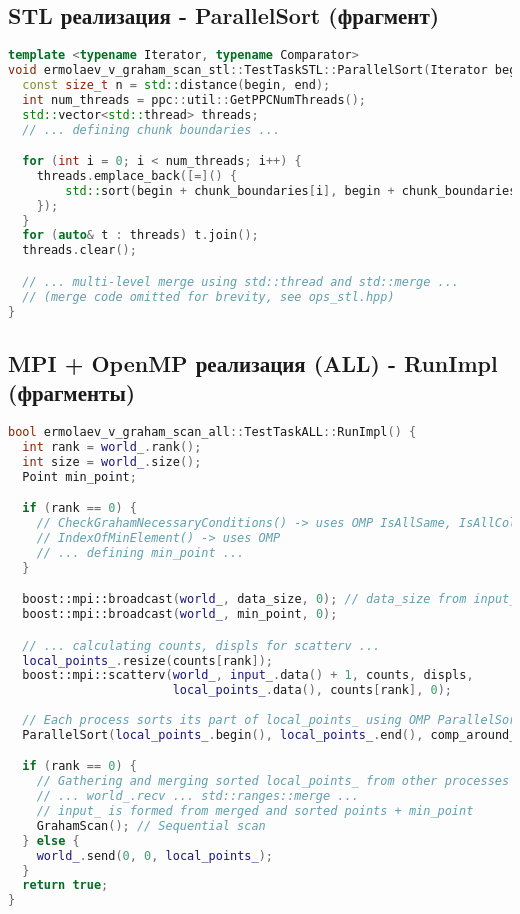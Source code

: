 \documentclass[12pt]{article}
\begin{document}
\subsection{STL реализация - ParallelSort (фрагмент)}
\begin{lstlisting}[language=C++]
template <typename Iterator, typename Comparator>
void ermolaev_v_graham_scan_stl::TestTaskSTL::ParallelSort(Iterator begin, Iterator end, Comparator comp) {
  const size_t n = std::distance(begin, end);
  int num_threads = ppc::util::GetPPCNumThreads();
  std::vector<std::thread> threads;
  // ... defining chunk boundaries ...

  for (int i = 0; i < num_threads; i++) {
    threads.emplace_back([=]() { 
        std::sort(begin + chunk_boundaries[i], begin + chunk_boundaries[i + 1], comp); 
    });
  }
  for (auto& t : threads) t.join();
  threads.clear();

  // ... multi-level merge using std::thread and std::merge ...
  // (merge code omitted for brevity, see ops_stl.hpp)
}
\end{lstlisting}
\newpage

\subsection{MPI + OpenMP реализация (ALL) - RunImpl (фрагменты)}
\begin{lstlisting}[language=C++]
bool ermolaev_v_graham_scan_all::TestTaskALL::RunImpl() {
  int rank = world_.rank();
  int size = world_.size();
  Point min_point;

  if (rank == 0) {
    // CheckGrahamNecessaryConditions() -> uses OMP IsAllSame, IsAllCollinear
    // IndexOfMinElement() -> uses OMP
    // ... defining min_point ...
  }

  boost::mpi::broadcast(world_, data_size, 0); // data_size from input_
  boost::mpi::broadcast(world_, min_point, 0);

  // ... calculating counts, displs for scatterv ...
  local_points_.resize(counts[rank]);
  boost::mpi::scatterv(world_, input_.data() + 1, counts, displs, 
                       local_points_.data(), counts[rank], 0);
  
  // Each process sorts its part of local_points_ using OMP ParallelSort
  ParallelSort(local_points_.begin(), local_points_.end(), comp_around_min_point);

  if (rank == 0) {
    // Gathering and merging sorted local_points_ from other processes
    // ... world_.recv ... std::ranges::merge ...
    // input_ is formed from merged and sorted points + min_point
    GrahamScan(); // Sequential scan
  } else {
    world_.send(0, 0, local_points_);
  }
  return true;
}
\end{lstlisting}
\end{document}

